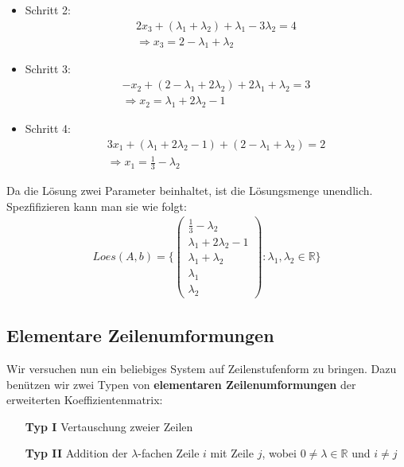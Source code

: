 \documentclass[11pt]{report}
\newcommand*\Zb[1] {\mathbb{#1}}
\newcommand*\f[1] {\textbf{#1}}
\begin{document}
\begin{itemize}
\begin{itemize}
\item Schritt 2:
\begin{align}
 2x_3 + (\lambda_1 + \lambda_2) + \lambda_1 - 3\lambda_2 = 4 \\
 \Rightarrow x_3 = 2 - \lambda_1 + \lambda_2
\end{align}

\item Schritt 3:
\begin{align}
 -x_2 + (2 - \lambda_1 + 2\lambda_2) + 2\lambda_1 + \lambda_2 = 3 \\
 \Rightarrow x_2 = \lambda_1 + 2\lambda_2-1
\end{align}

\item Schritt 4:
\begin{align}
 3x_1 + (\lambda_1 + 2\lambda_2  - 1) + (2- \lambda_1 + \lambda_2) = 2 \\
 \Rightarrow x_1 = \frac{1}{3} - \lambda_2
\end{align}
\end{itemize}
Da die Lösung zwei Parameter beinhaltet, ist die Lösungsmenge unendlich. Spezfifizieren kann man sie wie folgt:
\begin{align}
 Loes(A,b) = \{ \begin{pmatrix}
                 \frac{1}{3} - \lambda_2 \\ \lambda_1 + 2\lambda_2-1 \\ \lambda_1 + \lambda_2 \\ \lambda_1 \\ \lambda_2
                \end{pmatrix}
: \lambda_1, \lambda_2 \in \Zb{R}\}
\end{align}
\end{itemize}

\subsection{Elementare Zeilenumformungen}
Wir versuchen nun ein beliebiges System auf Zeilenstufenform zu bringen. Dazu benützen wir zwei Typen von \f{elementaren Zeilenumformungen} der erweiterten Koeffizientenmatrix:
\begin{itemize}
 \item[\f{Typ I}] Vertauschung zweier Zeilen
 \item[\f{Typ II}] Addition der $\lambda$-fachen Zeile $i$ mit Zeile $j$, wobei $0 \neq \lambda \in \Zb{R}$ und $i \neq j$
\end{itemize}
\end{document}
